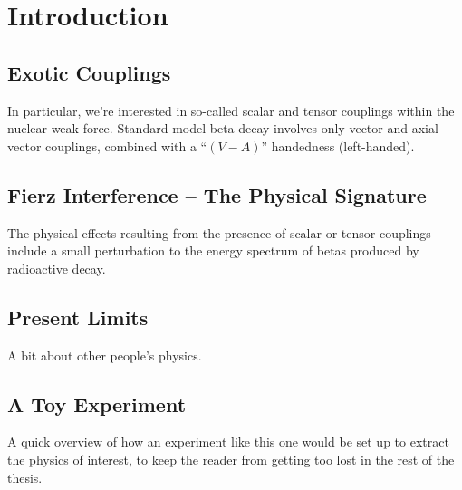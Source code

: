 


\clearpage
\chapter{Introduction}
\label{intro_chapter}

\section{Exotic Couplings}
	In particular, we're interested in so-called scalar and tensor couplings within the nuclear weak force. Standard model beta decay involves only vector and axial-vector couplings, combined with a ``$(V-A)$'' handedness (left-handed).  

\section{Fierz Interference -- The Physical Signature}
	The physical effects resulting from the presence of scalar or tensor couplings include a small perturbation to the energy spectrum of betas produced by radioactive decay.  


\section{Present Limits}
	A bit about other people's physics.

\section{A Toy Experiment}
	A quick overview of how an experiment like this one would be set up to extract the physics of interest, to keep the reader from getting too lost in the rest of the thesis.

